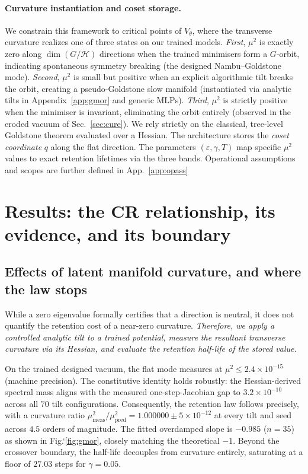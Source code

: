 \documentclass{article}
\begin{document}
\paragraph{Curvature instantiation and coset storage.} We constrain this framework to critical points of $V_\theta$, where the transverse curvature realizes one of three states on our trained models. \emph{First}, $\mu^2$ is exactly zero along $\dim(G/\mathcal H)$ directions when the trained minimisers form a $G$-orbit, indicating spontaneous symmetry breaking (the designed Nambu--Goldstone mode). \emph{Second}, $\mu^2$ is small but positive when an explicit algorithmic tilt breaks the orbit, creating a pseudo-Goldstone slow manifold (instantiated via analytic tilts in Appendix~\ref{app:gmor} and generic MLPs). \emph{Third}, $\mu^2$ is strictly positive when the minimiser is invariant, eliminating the orbit entirely (observed in the eroded vacuum of Sec.~\ref{sec:cure}). We rely strictly on the classical, tree-level Goldstone theorem evaluated over a Hessian. The architecture stores the \emph{coset coordinate} $q$ along the flat direction. The parameters $(\varepsilon,\gamma,T)$ map specific $\mu^2$ values to exact retention lifetimes via the three bands. Operational assumptions and scopes are further defined in App.~\ref{app:opass}

\section{Results: the CR relationship, its evidence, and its boundary}\label{sec:results}

\subsection{Effects of latent manifold curvature, and where the law stops}\label{sec:pricelist}

While a zero eigenvalue formally certifies that a direction is neutral, it does not quantify the retention cost of a near-zero curvature. \emph{Therefore, we apply a controlled analytic tilt to a trained potential, measure the resultant transverse curvature via its Hessian, and evaluate the retention half-life of the stored value.}

On the trained designed vacuum, the flat mode measures at $\mu^2\le2.4\!\times\!10^{-15}$ (machine precision). The constitutive identity holds robustly: the Hessian-derived spectral mass aligns with the measured one-step-Jacobian gap to $3.2\!\times\!10^{-10}$ across all $70$ tilt configurations. Consequently, the retention law follows precisely, with a curvature ratio $\mu^2_{\mathrm{meas}}/\mu^2_{\mathrm{pred}}=1.000000\pm5\!\times\!10^{-12}$ at every tilt and seed across $4.5$ orders of magnitude. The fitted overdamped slope is $-0.985$ ($n=35$) as shown in Fig.`\ref{fig:gmor}, closely matching the theoretical $-1$. Beyond the crossover boundary, the half-life decouples from curvature entirely, saturating at a floor of $27.03$ steps for $\gamma=0.05$.
\end{document}
